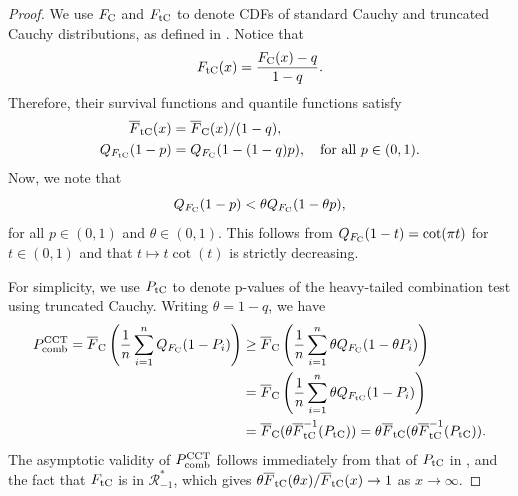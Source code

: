 \documentclass[12pt]{article}
\theoremstyle{plain}
\theoremstyle{plain}
\theoremstyle{definition}
\begin{document}
\begin{proof}
We use $F_{\rm C}$ and $F_{\rm tC}$ to denote CDFs of standard Cauchy and truncated Cauchy distributions, as defined in . Notice that
\[
F_{\rm tC}(x) = \frac{F_{\rm C}(x)-q}{1-q}.
\]
Therefore, their survival functions and quantile functions satisfy
\begin{align*}
\overline F_{\rm tC}(x) &= \overline F_{\rm C}(x)/(1-q),\\
Q_{F_{\rm tC}}(1-p) &= Q_{F_{\rm C}}(1-(1-q) p),\quad \text{for~all}~p\in (0,1).
\end{align*}
Now, we note that
\[
Q_{F_{\rm C}}(1- p)< \theta Q_{F_{\rm C}}(1-\theta p),
\]
for all $p\in (0,1)$ and $\theta\in (0,1)$. This follows from $Q_{F_{\rm C}}(1-t)=\cot(\pi t)$ for $t\in (0,1)$ and that $t\mapsto t \cot(t)$ is strictly decreasing.

For simplicity, we use $P_{\rm tC}$ to denote p-values of the heavy-tailed combination test using truncated Cauchy. Writing $\theta =1-q$, we have
\begin{align*}
P_{\rm comb}^{\rm CCT}=  \overline F_{\rm C}\left(\frac1 n\sum_{i=1}^ n Q_{F_{\rm C}}(1-P_i) \right)&\ge 
 \overline F_{\rm C}\left(\frac1 n\sum_{i=1}^ n \theta Q_{F_{\rm C}}(1-\theta P_i) \right)
 \\&=
\overline F_{\rm C}\left(\frac1 n\sum_{i=1}^ n \theta Q_{F_{\rm tC}} (1- P_i  ) \right) \\
&= \overline {F}_{\rm C}(\theta {\overline{F}_{\rm tC}^{-1}}(P_{\rm tC}))
=\theta  \overline {F}_{\rm tC}(\theta {\overline{F}_{\rm tC}^{-1}}(P_{\rm tC})).
\end{align*}
The asymptotic validity of $P_{\rm comb}^{\rm CCT}$ follows immediately from that of $P_{\rm tC}$ in , and the fact that $ {F}_{\rm tC}$ is in $\mathscr{R}_{-1}^*$, which gives $\theta \overline F_{\rm tC}(\theta x)/\overline F_{\rm tC}(x)\to1$ as $x\to \infty$.
\end{proof}
\end{document}
